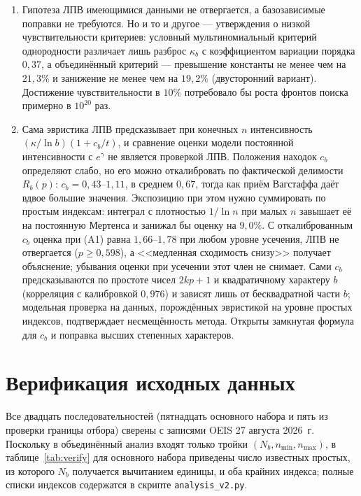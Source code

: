 \documentclass[11pt,a4paper]{article}
\theoremstyle{plain}
\theoremstyle{remark}
\newcommand{\Rb}{R_b}
\newcommand{\eg}{e^{\gamma}}
\begin{document}
\begin{enumerate}
\item Гипотеза ЛПВ имеющимися данными не отвергается, а базозависимые поправки не
требуются. Но и то и другое --- утверждения о низкой чувствительности критериев:
условный мультиномиальный критерий однородности различает лишь разброс $\kappa_b$
с коэффициентом вариации порядка $0{,}37$, а объединённый критерий --- превышение
константы не менее чем на $21{,}3\%$ и занижение не менее чем на $19{,}2\%$
(двусторонний вариант). Достижение чувствительности в $10\%$ потребовало
бы роста фронтов поиска примерно в $10^{20}$ раз.

\item Сама эвристика ЛПВ предсказывает при конечных $n$ интенсивность
$(\kappa/\ln b)(1+c_b/t)$, и сравнение оценки модели постоянной интенсивности с
$\eg$ не является проверкой ЛПВ. Положения находок $c_b$ определяют слабо, но
его можно откалибровать по фактической делимости $\Rb(p)$: $c_b=0{,}43$--$1{,}11$,
в среднем $0{,}67$, тогда как приём Вагстаффа даёт вдвое большие значения.
Экспозицию при этом нужно суммировать по простым индексам: интеграл с плотностью
$1/\ln n$ при малых $n$ завышает её на постоянную Мертенса и занижал бы оценку на
$9{,}0\%$. С откалиброванным $c_b$ оценка при (A1) равна $1{,}66$--$1{,}78$ при
любом уровне усечения, ЛПВ не отвергается ($p\ge0{,}598$), а <<медленная сходимость
снизу>> получает объяснение; убывания оценки при усечении этот член не снимает.
Сами $c_b$ предсказываются по простоте чисел $2kp+1$ и квадратичному характеру $b$
(корреляция с калибровкой $0{,}976$) и зависят лишь от бесквадратной части $b$;
модельная проверка на данных, порождённых эвристикой на уровне простых индексов,
подтверждает несмещённость метода.
Открыты замкнутая формула для $c_b$ и поправка высших степенных характеров.
\end{enumerate}


\appendix
\section{Верификация исходных данных}\label{app:data}

Все двадцать последовательностей (пятнадцать основного набора и пять из проверки
границы отбора) сверены с записями OEIS 27 августа 2026~г.
Поскольку в объединённый анализ входят только тройки $(N_b,n_{\min},n_{\max})$,
в таблице~\ref{tab:verify} для основного набора приведены число известных простых, из которого
$N_b$ получается вычитанием единицы, и оба крайних индекса; полные списки
индексов содержатся в скрипте \texttt{analysis\_v2.py}.
\end{document}

